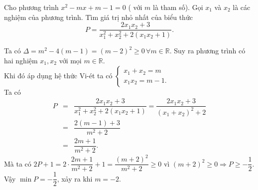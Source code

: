 \begin{ex}%
	Cho phương trình $x^2-mx+m-1=0$ ( với $m$ là tham số). Gọi $x_1$ và $x_2$ là các nghiệm của phương trình. Tìm giá trị nhỏ nhất của biểu thức $$P= \dfrac{2x_1x_2+3}{x_1^2+x_2^2+2(x_1x_2+1)}.$$

	\loigiai
	{ Ta có $\Delta =m^2-4(m-1)=(m-2)^2 \geq 0 \,\forall m \in \mathbb{R}.$ Suy ra phương trình có hai nghiệm $x_1, x_2$ với mọi $m \in \mathbb{R}.$\\
	Khi đó áp dụng hệ thức Vi-ét ta có $\begin {cases} x_1+x_2=m\\x_1x_2=m-1. \end {cases}$\\
	Ta có 
	\begin{eqnarray*}
	P &=& \dfrac{2x_1x_2+3}{x_1^2+x_2^2+2(x_1x_2+1)} = \dfrac{2x_1x_2+3}{(x_1+x_2)^2+2}\\
	&=& \dfrac{2(m-1)+3}{m^2+2}\\
	&=& \dfrac{2m+1}{m^2+2}.
	\end{eqnarray*}
Mà ta có $2P+1 = 2\cdot \dfrac{2m+1}{m^2+2}+1=\dfrac{(m+2)^2}{m^2+2}\geq 0$ vì $(m+2)^2\geq 0 \Rightarrow P \geq -\dfrac{1}{2}.$\\
Vậy $\min P =-\dfrac{1}{2}$, xảy ra khi $m=-2$.
}
\end{ex}



